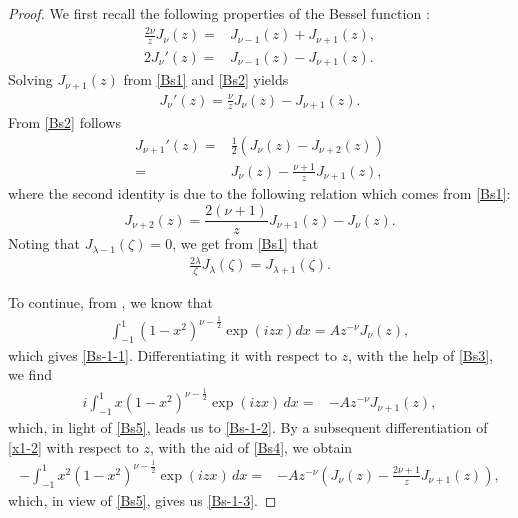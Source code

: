 \documentclass[11pt,a4paper]{article}
\numberwithin{equation}{section}
\begin{document}
{\begin{appendices}
\begin{proof}
We first recall the following properties of the Bessel function \cite[(5.3.6)-(5.3.7)]{Lebedev}:
\begin{align}
\frac{2\nu}{z}J_{\nu}(z)=&J_{\nu-1}(z)+J_{\nu+1}(z),\label{Bs1}\\
2J_{\nu}'(z)=&J_{\nu-1}(z)-J_{\nu+1}(z).\label{Bs2}
\end{align}
Solving $J_{\nu+1}(z)$ from \eqref{Bs1} and \eqref{Bs2} yields
\begin{align}\label{Bs3}
J_{\nu}'(z)=\frac{\nu}{z}J_{\nu}(z)-J_{\nu+1}(z).
\end{align}
From \eqref{Bs2} follows
\begin{align}
J_{\nu+1}'(z)=&\frac{1}{2}\left(J_{\nu}(z)-J_{\nu+2}(z)\right)\nonumber\\
=&J_{\nu}(z)-\frac{\nu+1}{z}J_{\nu+1}(z),\label{Bs4}
\end{align}
where the second identity is due to the following relation which comes from \eqref{Bs1}:
\[J_{\nu+2}(z)=\frac{2(\nu+1)}{z}J_{\nu+1}(z)-J_{\nu}(z).\]
Noting that $J_{\lambda-1}(\zeta)=0$, we get from \eqref{Bs1} that
\begin{align}\label{Bs5}
\frac{2\lambda}{\zeta}J_{\lambda}(\zeta)=J_{\lambda+1}(\zeta).
\end{align}

To continue, from \cite[eq. 10, p. 912]{GR}, we know that
\begin{align}\label{h0-1}
\int_{-1}^1(1-x^2)^{\nu-\frac{1}{2}}\exp(iz x)dx=Az^{-\nu}J_{\nu}(z),
\end{align}
which gives \eqref{Bs-1-1}.
Differentiating it with respect to $z$, with the help of \eqref{Bs3}, we find
\begin{align}
i\int_{-1}^{1}x(1-x^2)^{\nu-\frac{1}{2}}\exp(\mathit{i}z x)\, dx
=&-Az^{-\nu}J_{\nu+1}(z),\label{x1-2}
\end{align}
which, in light of \eqref{Bs5}, leads us to \eqref{Bs-1-2}.
By a subsequent differentiation of \eqref{x1-2} with respect to $z$, with the aid of \eqref{Bs4}, we obtain
\begin{align}
-\int_{-1}^{1}x^2(1-x^2)^{\nu-\frac{1}{2}}\exp(\mathit{i}z x)\, dx
=&- Az^{-\nu}\left(J_{\nu}(z)-\frac{2\nu+1}{z} J_{\nu+1}(z)\right),\label{Bs6}
\end{align}
which, in view of \eqref{Bs5}, gives us \eqref{Bs-1-3}.


\end{proof}
\end{appendices}}
\end{document}
